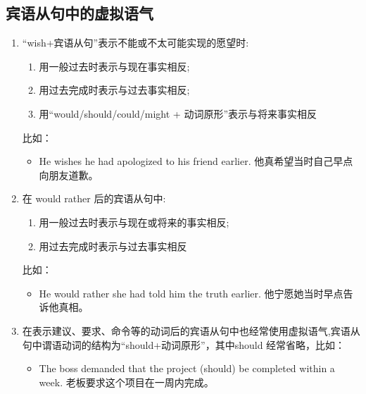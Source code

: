 \subsection{宾语从句中的虚拟语气}

\begin{enumerate}
  \item “wish+宾语从句”表示不能或不太可能实现的愿望时:
        \begin{enumerate}
          \item 用一般过去时表示与现在事实相反;
          \item 用过去完成时表示与过去事实相反;
          \item 用“would/should/could/might + 动词原形”表示与将来事实相反
        \end{enumerate}
        比如：
        \begin{itemize}
          \item He wishes he had apologized to his friend earlier. 他真希望当时自己早点向朋友道歉。
        \end{itemize}
  \item 在 would rather 后的宾语从句中:
        \begin{enumerate}
          \item 用一般过去时表示与现在或将来的事实相反;
          \item 用过去完成时表示与过去事实相反
        \end{enumerate}
        比如：
        \begin{itemize}
          \item He would rather she had told him the truth earlier. 他宁愿她当时早点告诉他真相。
        \end{itemize}
  \item 在表示建议、要求、命令等的动词后的宾语从句中也经常使用虚拟语气,宾语从句中谓语动词的结构为“should+动词原形”，其中should 经常省略，比如：
        \begin{itemize}
          \item The boss demanded that the project (should) be completed within a week. 老板要求这个项目在一周内完成。
        \end{itemize}
\end{enumerate}




